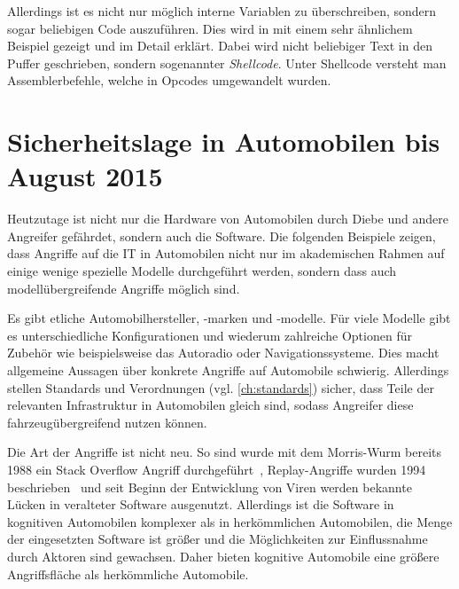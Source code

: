 Allerdings ist es nicht nur möglich interne Variablen zu überschreiben, sondern
sogar beliebigen Code auszuführen. Dies wird in \cite{Mixter} mit einem sehr
ähnlichem Beispiel gezeigt und im Detail erklärt. Dabei wird nicht beliebiger
Text in den Puffer geschrieben, sondern sogenannter \textit{Shellcode}. Unter
Shellcode versteht man Assemblerbefehle, welche in Opcodes umgewandelt wurden.


\section{Sicherheitslage in Automobilen bis August 2015}\label{sec:sicherheitslage}
Heutzutage ist nicht nur die Hardware von Automobilen durch Diebe und andere
Angreifer gefährdet, sondern auch die Software. Die folgenden Beispiele zeigen,
dass Angriffe auf die IT in Automobilen nicht nur im akademischen Rahmen
auf einige wenige spezielle Modelle durchgeführt werden, sondern dass auch
modellübergreifende Angriffe möglich sind.

Es gibt etliche Automobilhersteller, -marken und -modelle. Für viele Modelle
gibt es unterschiedliche Konfigurationen und wiederum zahlreiche Optionen für
Zubehör wie beispielsweise das Autoradio oder Navigationssysteme. Dies macht
allgemeine Aussagen über konkrete Angriffe auf Automobile schwierig. Allerdings
stellen Standards und Verordnungen (vgl. \cref{ch:standards}) sicher, dass
Teile der relevanten Infrastruktur in Automobilen gleich sind, sodass Angreifer
diese fahrzeugübergreifend nutzen können.

Die Art der Angriffe ist nicht neu. So sind wurde mit dem Morris-Wurm bereits
1988 ein Stack Overflow Angriff durchgeführt~\cite{Seltzer2013},
Replay-Angriffe wurden 1994 beschrieben~\cite{Syverson1994} und seit Beginn
der Entwicklung von Viren werden bekannte Lücken in veralteter Software
ausgenutzt. Allerdings ist die Software in kognitiven Automobilen komplexer
als in herkömmlichen Automobilen, die Menge der eingesetzten Software ist
größer und die Möglichkeiten zur Einflussnahme durch Aktoren sind gewachsen.
Daher bieten kognitive Automobile eine größere Angriffsfläche als
herkömmliche Automobile.

